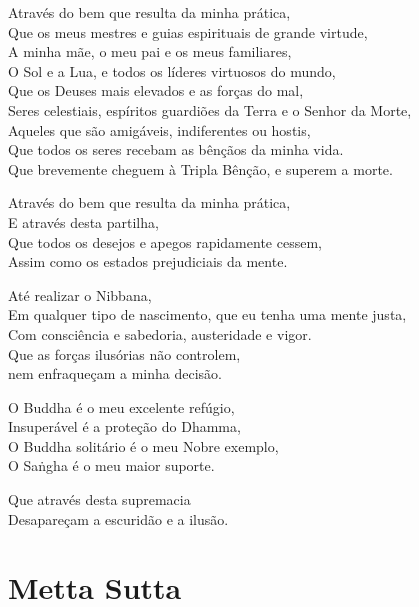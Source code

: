 Através do bem que resulta da minha prática,\\
Que os meus mestres e guias espirituais de grande virtude,\\
A minha mãe, o meu pai e os meus familiares,\\
O Sol e a Lua, e todos os líderes virtuosos do mundo,\\
Que os Deuses mais elevados e as forças do mal,\\
Seres celestiais, espíritos guardiões da Terra e o Senhor da Morte,\\
Aqueles que são amigáveis, indiferentes ou hostis,\\
Que todos os seres recebam as bênçãos da minha vida.\\
Que brevemente cheguem à Tripla Bênção, e superem a morte.

Através do bem que resulta da minha prática,\\
E através desta partilha,\\
Que todos os desejos e apegos rapidamente cessem,\\
Assim como os estados prejudiciais da mente.

Até realizar o Nibbana,\\
Em qualquer tipo de nascimento, que eu tenha uma mente justa,\\
Com consciência e sabedoria, austeridade e vigor.\\
Que as forças ilusórias não controlem,\\
nem enfraqueçam a minha decisão.

O Buddha é o meu excelente refúgio,\\
Insuperável é a proteção do Dhamma,\\
O Buddha solitário é o meu Nobre exemplo,\\
O Saṅgha é o meu maior suporte.

Que através desta supremacia\\
Desapareçam a escuridão e a ilusão.

\chapter*[Metta Sutta]{Metta Sutta}

\delegateSetUseNext


\begin{leader}
\end{leader}


